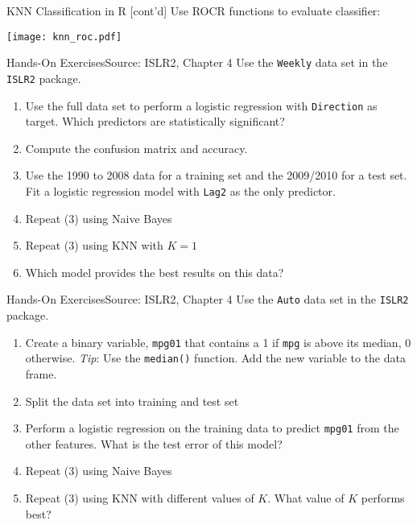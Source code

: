 \documentclass[ignorenonframetext,xcolor=x11names]{beamer}
\begin{document}
\begin{frame}[fragile]{KNN Classification in R \small [cont'd]}
\small 
Use ROCR functions to evaluate classifier:

\vspace{-\baselineskip}
\begin{center}
\texttt{[image: knn\_roc.pdf]}
\end{center}
\end{frame}

\begin{frame}{Hands-On Exercises}{Source: ISLR2, Chapter 4}
Use the \texttt{Weekly} data set in the \texttt{ISLR2} package.
\begin{enumerate}
   \item Use the full data set to perform a logistic regression with \texttt{Direction} as target. Which predictors are statistically significant?
   \item Compute the confusion matrix and accuracy.
   \item Use the 1990 to 2008 data for a training set and the 2009/2010 for a test set. Fit a logistic regression model with \texttt{Lag2} as the only predictor.
   \item Repeat (3) using Naive Bayes
   \item Repeat (3) using KNN with $K=1$
   \item Which model provides the best results on this data?
\end{enumerate}
\end{frame}

\begin{frame}{Hands-On Exercises}{Source: ISLR2, Chapter 4}
Use the \texttt{Auto} data set in the \texttt{ISLR2} package.
\begin{enumerate}
   \item Create a binary variable, \texttt{mpg01} that contains a 1 if \texttt{mpg} is above its median, 0 otherwise. \emph{Tip}: Use the \texttt{median()} function. Add the new variable to the data frame.
   \item Split the data set into training and test set
   \item Perform a logistic regression on the training data to predict \texttt{mpg01} from the other features. What is the test error of this model?
   \item Repeat (3) using Naive Bayes
   \item Repeat (3) using KNN with different values of $K$. What value of $K$ performs best?
\end{enumerate}
\end{frame}
\end{document}
